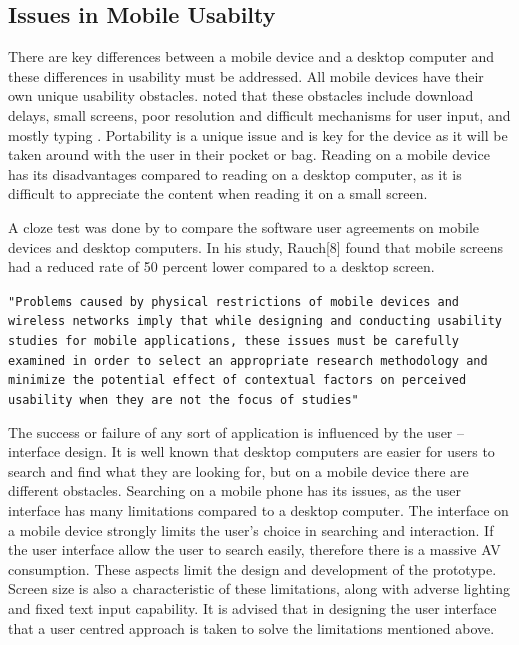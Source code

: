 \documentclass[runningheads,a4paper]{llncs}
\begin{document}
\subsection{Issues in Mobile Usabilty}
\label{sec:Issues in Mobile Usabilty}
There are key differences between a mobile device and a desktop computer and these differences in usability must be addressed. All mobile devices have their own unique usability obstacles. \citet{rauch2011mobile} noted that these obstacles include download delays, small screens, poor resolution and difficult mechanisms for user input, and mostly typing . 
Portability is a unique issue and is key for the device as it will be taken around with the user in their pocket or bag. 
Reading on a mobile device has its disadvantages compared to reading on a desktop computer, as it is difficult to appreciate the content when reading it on a small screen.
\begin{inparaenum}[]

\end{inparaenum}
 A cloze test was done by  \citet{rauch2011mobile} to compare the software user agreements on mobile devices and desktop computers. In his study, Rauch[8] found that mobile screens had a reduced rate of 50 percent  lower compared to a desktop screen.

\begin{inparaenum}[]
{\texttt{"Problems caused by physical restrictions of mobile devices and wireless networks imply that while designing and conducting usability studies for mobile applications, these issues must be carefully examined in order to select an appropriate research methodology and minimize the potential effect of contextual factors on perceived usability when they are not the focus of studies"
 \cite{nayebi2012state}}} 
\end{inparaenum}


\begin{inparaenum}[]
The success or failure of any sort of application is influenced by the user – interface design. It is well known that desktop computers are easier for users to search and find what they are looking for, but on a mobile device there are different obstacles. Searching on a mobile phone has its issues, as the user interface has many limitations compared to a desktop computer. The interface on a mobile device strongly limits the user’s choice in searching and interaction. If the user interface allow the user to search easily, therefore there is a massive AV consumption. These aspects limit the design and development of the prototype. Screen size is also a characteristic of these limitations, along with adverse lighting and fixed text input capability. It is advised that in designing the user interface that a user centred approach is taken to solve the limitations mentioned above.\cite{hussain2008user}
\end{inparaenum}
\end{document}
